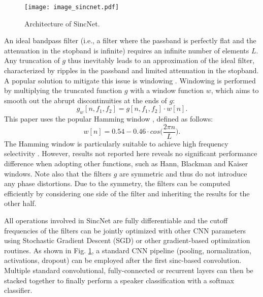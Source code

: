 \documentclass{article}
\begin{document}
 \begin{figure}[t!]
 \centering
   \texttt{[image: image\_sincnet.pdf]}
 \caption{Architecture of SincNet.}
 \label{fig:sinc_arch}
 \end{figure}
 
An ideal bandpass filter (i.e., a filter where the passband is perfectly flat and the attenuation in the stopband is infinite) requires an infinite number of elements $L$. Any truncation of $g$ thus inevitably leads to an approximation of the ideal filter, characterized by ripples in the passband and limited  attenuation  in  the  stopband.   A popular solution to mitigate this issue is windowing \cite{rabiner11}. Windowing is performed by multiplying the truncated function $g$ with a window function $w$, which aims to smooth out the abrupt discontinuities at the  ends  of  $g$:
\begin{equation}
g_{w}[n,f_1,f_2]= g[n,f_1,f_2] \cdot w[n].
\end{equation}
This paper uses the popular Hamming window \cite{mitra}, defined as follows:
\begin{equation}
w[n]= 0.54-0.46 \cdot cos\Big(\frac{2\pi n}{L}\Big).
\end{equation}
The Hamming window is particularly suitable to achieve high frequency selectivity \cite{mitra}. However, results not reported here reveals no significant performance difference when adopting other functions, such as Hann, Blackman and Kaiser windows. Note also that the filters $g$ are symmetric and thus do not introduce any phase distortions. Due to the symmetry, the filters can be computed efficiently by considering one side of the filter and inheriting the results for the other half.

All operations involved in SincNet are fully differentiable and the cutoff frequencies of the filters can be jointly optimized with other CNN parameters using Stochastic Gradient Descent (SGD) or other gradient-based optimization routines. 
As shown in Fig.  \ref{fig:sinc_arch}, a standard CNN pipeline (pooling, normalization, activations, dropout) can be employed after the first sinc-based convolution.
Multiple standard convolutional, fully-connected or recurrent layers \cite{gru2,ravanelli_is17,li_gru,ravanelli_twin} can then be stacked together to finally perform a speaker classification with a softmax classifier. 

\end{document}
